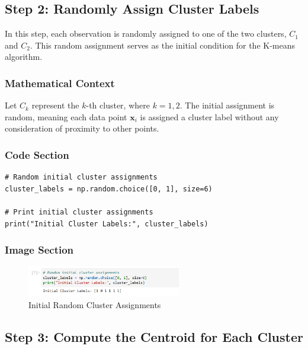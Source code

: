 \documentclass{exam}
\begin{document}
\newpage

\subsection{Step 2: Randomly Assign Cluster Labels}

In this step, each observation is randomly assigned to one of the two clusters, \( C_1 \) and \( C_2 \). This random assignment serves as the initial condition for the K-means algorithm.

\subsubsection*{Mathematical Context}
Let \( C_k \) represent the \( k \)-th cluster, where \( k = 1, 2 \). The initial assignment is random, meaning each data point \( \mathbf{x}_i \) is assigned a cluster label without any consideration of proximity to other points.

\subsubsection*{Code Section}

\begin{verbatim}
# Random initial cluster assignments
cluster_labels = np.random.choice([0, 1], size=6)

# Print initial cluster assignments
print("Initial Cluster Labels:", cluster_labels)
\end{verbatim}

\subsubsection*{Image Section}

\begin{figure}[h!]
    \centering
    \includegraphics[width=0.6\textwidth]{images/initial_cluster_lab.png}
    \caption{Initial Random Cluster Assignments}
    \label{fig:initial_cluster_assignment}
\end{figure}

\newpage

\subsection{Step 3: Compute the Centroid for Each Cluster}
\end{document}
